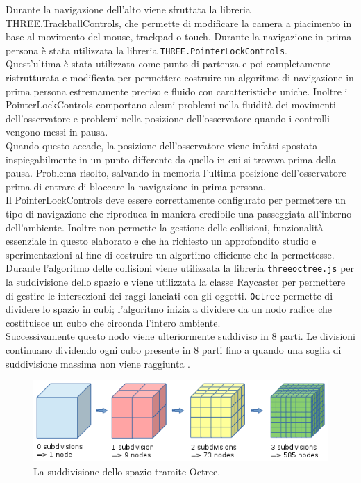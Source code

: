 Durante la navigazione dell’alto viene sfruttata la libreria THREE.TrackballControls, che permette di modificare la camera a piacimento in base al movimento del mouse, trackpad o touch. Durante la navigazione in prima persona è stata utilizzata la libreria \texttt{THREE.PointerLockControls}.
\\
Quest’ultima è stata utilizzata come punto di partenza e poi completamente ristrutturata e modificata per permettere costruire un algoritmo di navigazione in prima persona estremamente preciso e fluido con caratteristiche uniche.
Inoltre i PointerLockControls comportano alcuni problemi nella fluidità dei movimenti dell’osservatore e problemi nella posizione dell’osservatore quando i controlli vengono messi in pausa.
\\
Quando questo accade, la posizione dell’osservatore viene infatti spostata inspiegabilmente in un punto differente da quello in cui si trovava prima della pausa. Problema risolto, salvando in memoria l’ultima posizione dell’osservatore prima di entrare di bloccare la navigazione in prima persona.
\\
Il PointerLockControls deve essere correttamente configurato per permettere un tipo di navigazione che riproduca in maniera credibile una passeggiata all’interno dell’ambiente.
Inoltre non permette la gestione delle collisioni, funzionalità essenziale in questo elaborato e che ha richiesto un approfondito studio e sperimentazioni al fine di costruire un algortimo efficiente che la permettesse.
\\
Durante l’algoritmo delle collisioni viene utilizzata la libreria \texttt{threeoctree.js} per la suddivisione dello spazio e viene utilizzata la classe Raycaster per permettere di gestire le intersezioni dei raggi lanciati con gli oggetti.
\texttt{Octree} permette di dividere lo spazio in cubi; l’algoritmo inizia a dividere da un nodo radice che costituisce un cubo che circonda l’intero ambiente.
\\
Successivamente questo nodo viene ulteriormente suddiviso in 8 parti. Le divisioni continuano dividendo ogni cubo presente in 8 parti fino a quando una soglia di suddivisione massima non viene raggiunta \cite{octree}.

\begin{figure}[htb]
 \centering
 \includegraphics[width=1\linewidth]{images/chapter_navigazione_scena/full_octree.png}\hfill
 \caption[Octree e la suddivisione dello spazio.]{La suddivisione dello spazio tramite Octree.}
 \label{fig:navigazione_scena_collision_full_octree}
\end{figure}

